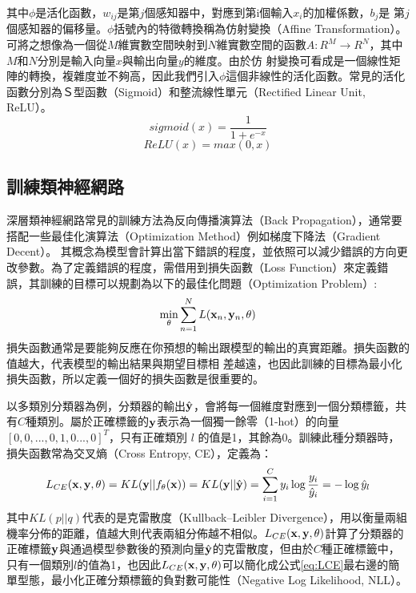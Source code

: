 其中$\phi$是活化函數，$w_{ij}$是第$j$個感知器中，對應到第i個輸入$x_i$的加權係數，$b_j$是
第$j$個感知器的偏移量。$\phi$括號內的特徵轉換稱為仿射變換（Affine
Transformation）。可將之想像為一個從$M$維實數空間映射到$N$維實數空間的函數$A:
R^M \rightarrow R^N$，其中$M$和$N$分別是輸入向量$x$與輸出向量$y$的維度。由於仿
射變換可看成是一個線性矩陣的轉換，複雜度並不夠高，因此我們引入$\phi$這個非線性的活化函數。常見的活化函數分別為Ｓ型函數（Sigmoid）和整流線性單元（Rectified Linear Unit, ReLU）。
\begin{equation}
sigmoid(x) = \frac{1}{1 + e^{-x}}
\end{equation}
\begin{equation}
ReLU(x) = max( 0 , x )
\end{equation}


\subsection{訓練類神經網路}
深層類神經網路常見的訓練方法為反向傳播演算法（Back Propagation）\cite{rumelhart1988learning}，通常要搭配一些最佳化演算法（Optimization Method）例如梯度下降法（Gradient Decent）。
其概念為模型會計算出當下錯誤的程度，並依照可以減少錯誤的方向更改參數。為了定義錯誤的程度，需借用到損失函數（Loss
Function）來定義錯誤，其訓練的目標可以規劃為以下的最佳化問題（Optimization
Problem）:
\begin{equation}
\min_{\theta}{ \sum_{n=1}^{N}{ {L( \bold{x}_n , \bold{y}_n ,\theta)}}}
\end{equation}
損失函數通常是要能夠反應在你預想的輸出跟模型的輸出的真實距離。損失函數的值越大，代表模型的輸出結果與期望目標相
差越遠，也因此訓練的目標為最小化損失函數，所以定義一個好的損失函數是很重要的。

以多類別分類器為例，分類器的輸出$\hat{\bold{y}}$，會將每一個維度對應到一個分類標籤，共有$C$種類別。屬於正確標籤的$\bold{y}$表示為一個獨一餘零（1-hot）的向量$[0, 0 , ... , 0 , 1 , 0 ... , 0]^T $，只有正確類別 $l$ 的值是1，其餘為0。訓練此種分類器時，損失函數常為交叉熵（Cross Entropy, CE），定義為：
\begin{equation} 
\label{eq:LCE}
L_{CE}(\bold{x} , \bold{y} , \theta) = KL( \bold{y} || f_{\theta}(\bold{x}) ) = KL(\bold{y} || \hat{\bold{y} }) = \sum_{i = 1}^{C} y_i \log{ \frac{y_i}{\hat{y}_i} } = - \log \hat{y}_{l} 
\end{equation}
其中$KL(p||q)$代表的是克雷散度（Kullback–Leibler Divergence），用以衡量兩組機率分佈的距離，值越大則代表兩組分佈越不相似。$L_{CE}(\bold{x} , \bold{y} , \theta) $計算了分類器的正確標籤$\bold{y}$與通過模型參數後的預測向量$\hat{\bold{y}}$的克雷散度，但由於$C$種正確標籤中，只有一個類別$l$的值為1，也因此$L_{CE}(\bold{x} , \bold{y} , \theta) $可以簡化成公式\ref{eq:LCE}最右邊的簡單型態，最小化正確分類標籤的負對數可能性（Negative Log Likelihood, NLL）。

